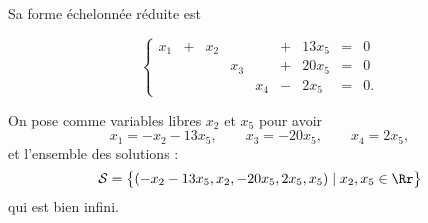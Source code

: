 \documentclass[class=report,crop=false]{standalone}
\begin{document}
Sa forme échelonnée réduite est

\[ \left\{
\begin{array}{ccccccccc}
x_1 &+ &x_2 &&& + &13x_5 & = & 0\\
&&&x_3 & &+ &20x_5 & = & 0\\
&&&&x_4  &-&2x_5 & = & 0.
\end{array} \right.
\]

On pose comme variables libres $x_2$ et $x_5$
pour avoir
$$x_1 = -x_2-13x_5,\qquad x_3 = -20x_5, \qquad x_4 = 2x_5,$$
et l'ensemble des solutions :
$$\mathcal{S}= \big\lbrace (-x_2-13x_5, x_2,-20x_5, 2x_5, x_5) \mid x_2,x_5 \in \Rr \big\rbrace$$
qui est bien infini.

\end{document}
